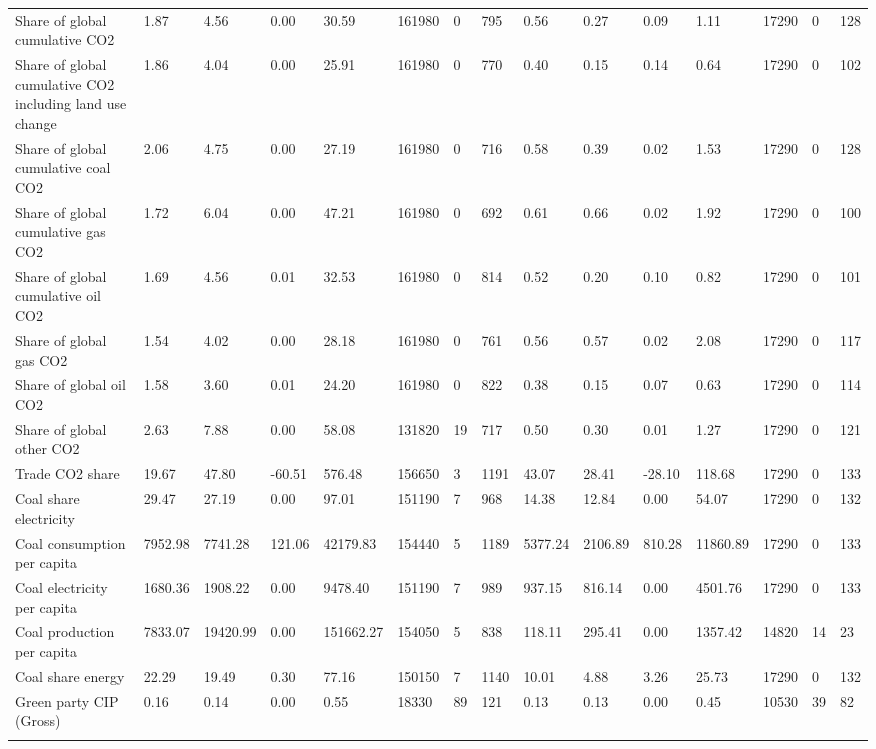 \begin{longtable}{lllllllllllllll}
\addlinespace
Share of global cumulative CO2 & 1.87 & 4.56 & 0.00 & 30.59 & 161980 & 0 & 795 & 0.56 & 0.27 & 0.09 & 1.11 & 17290 & 0 & 128\\
Share of global cumulative CO2 including land use change & 1.86 & 4.04 & 0.00 & 25.91 & 161980 & 0 & 770 & 0.40 & 0.15 & 0.14 & 0.64 & 17290 & 0 & 102\\
Share of global cumulative coal CO2 & 2.06 & 4.75 & 0.00 & 27.19 & 161980 & 0 & 716 & 0.58 & 0.39 & 0.02 & 1.53 & 17290 & 0 & 128\\
Share of global cumulative gas CO2 & 1.72 & 6.04 & 0.00 & 47.21 & 161980 & 0 & 692 & 0.61 & 0.66 & 0.02 & 1.92 & 17290 & 0 & 100\\
Share of global cumulative oil CO2 & 1.69 & 4.56 & 0.01 & 32.53 & 161980 & 0 & 814 & 0.52 & 0.20 & 0.10 & 0.82 & 17290 & 0 & 101\\
\addlinespace
Share of global gas CO2 & 1.54 & 4.02 & 0.00 & 28.18 & 161980 & 0 & 761 & 0.56 & 0.57 & 0.02 & 2.08 & 17290 & 0 & 117\\
Share of global oil CO2 & 1.58 & 3.60 & 0.01 & 24.20 & 161980 & 0 & 822 & 0.38 & 0.15 & 0.07 & 0.63 & 17290 & 0 & 114\\
Share of global other CO2 & 2.63 & 7.88 & 0.00 & 58.08 & 131820 & 19 & 717 & 0.50 & 0.30 & 0.01 & 1.27 & 17290 & 0 & 121\\
Trade CO2 share & 19.67 & 47.80 & -60.51 & 576.48 & 156650 & 3 & 1191 & 43.07 & 28.41 & -28.10 & 118.68 & 17290 & 0 & 133\\
Coal share electricity & 29.47 & 27.19 & 0.00 & 97.01 & 151190 & 7 & 968 & 14.38 & 12.84 & 0.00 & 54.07 & 17290 & 0 & 132\\
\addlinespace
Coal consumption per capita & 7952.98 & 7741.28 & 121.06 & 42179.83 & 154440 & 5 & 1189 & 5377.24 & 2106.89 & 810.28 & 11860.89 & 17290 & 0 & 133\\
Coal electricity per capita & 1680.36 & 1908.22 & 0.00 & 9478.40 & 151190 & 7 & 989 & 937.15 & 816.14 & 0.00 & 4501.76 & 17290 & 0 & 133\\
Coal production per capita & 7833.07 & 19420.99 & 0.00 & 151662.27 & 154050 & 5 & 838 & 118.11 & 295.41 & 0.00 & 1357.42 & 14820 & 14 & 23\\
Coal share energy & 22.29 & 19.49 & 0.30 & 77.16 & 150150 & 7 & 1140 & 10.01 & 4.88 & 3.26 & 25.73 & 17290 & 0 & 132\\
Green party CIP (Gross) & 0.16 & 0.14 & 0.00 & 0.55 & 18330 & 89 & 121 & 0.13 & 0.13 & 0.00 & 0.45 & 10530 & 39 & 82\\
\addlinespace

\end{longtable}
